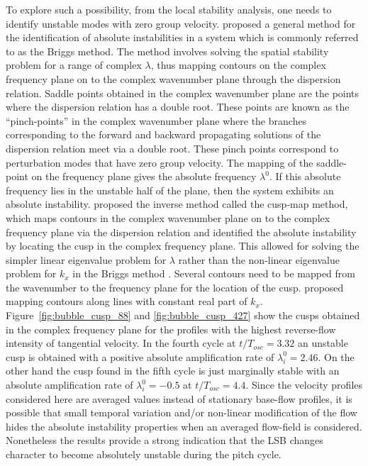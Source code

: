 To explore such a possibility, from the local stability analysis, one needs to identify unstable modes with zero group velocity. \cite{briggs64} proposed a general method for the identification of absolute instabilities in a system which is commonly referred to as the Briggs method. The method involves solving the spatial stability problem for a range of complex $\lambda$, thus mapping contours on the complex frequency plane on to the complex wavenumber plane through the dispersion relation. Saddle points obtained in the complex wavenumber plane are the points where the dispersion relation has a double root. These points are known as the ``pinch-points'' in the complex wavenumber plane where the branches corresponding to the forward and backward propagating solutions of the dispersion relation meet via a double root. These pinch points correspond to perturbation modes that have zero group velocity. The mapping of the saddle-point on the frequency plane gives the absolute frequency $\lambda^{0}$. If this absolute frequency lies in the unstable half of the plane, then the system exhibits an absolute instability. \cite{kupfer87} proposed the inverse method called the cusp-map method, which maps contours in the complex wavenumber plane on to the complex frequency plane via the dispersion relation and identified the absolute instability by locating the cusp in the complex frequency plane. This allowed for solving the simpler linear eigenvalue problem for $\lambda$ rather than the non-linear eigenvalue problem for $k_{x}$ in the Briggs method \citep{briggs64}. Several contours need to be mapped from the wavenumber to the frequency plane for the location of the cusp. \cite{kupfer87} proposed mapping contours along lines with constant real part of $k_{x}$. Figure~\ref{fig:bubble_cusp_88} and \ref{fig:bubble_cusp_427} show the cusps obtained in the complex frequency plane for the profiles with the highest reverse-flow intensity of tangential velocity. In the fourth cycle at $t/T_{osc}=3.32$ an unstable cusp is obtained with a positive absolute amplification rate of $\lambda^{0}_{i}=2.46$. On the other hand the cusp found in the fifth cycle is just marginally stable with an absolute amplification rate of $\lambda^{0}_{i}=-0.5$ at $t/T_{osc}=4.4$. Since the velocity profiles considered here are averaged values instead of stationary base-flow profiles, it is possible that small temporal variation and/or non-linear modification of the flow hides the absolute instability properties when an averaged flow-field is considered. Nonetheless the results provide a strong indication that the LSB changes character to become absolutely unstable during the pitch cycle.

